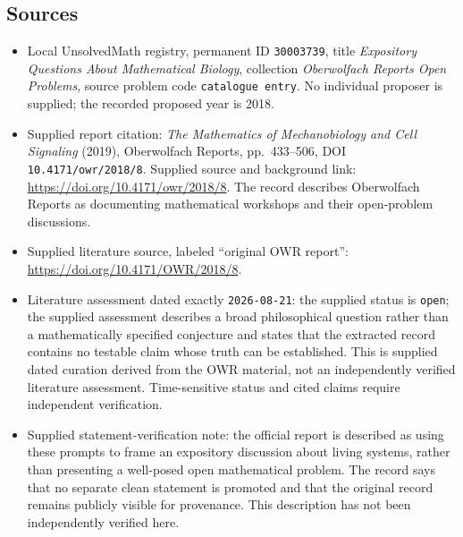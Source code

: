 \documentclass[11pt]{article}
\begin{document}
\subsection{Sources}
\begin{itemize}
\item Local UnsolvedMath registry, permanent ID \texttt{30003739}, title \emph{Expository Questions About Mathematical Biology}, collection \emph{Oberwolfach Reports Open Problems}, source problem code \texttt{catalogue entry}. No individual proposer is supplied; the recorded proposed year is 2018.
\item Supplied report citation: \emph{The Mathematics of Mechanobiology and Cell Signaling} (2019), Oberwolfach Reports, pp.\ 433--506, DOI \texttt{10.4171/owr/2018/8}. Supplied source and background link: \url{https://doi.org/10.4171/owr/2018/8}. The record describes Oberwolfach Reports as documenting mathematical workshops and their open-problem discussions.
\item Supplied literature source, labeled ``original OWR report'': \url{https://doi.org/10.4171/OWR/2018/8}.
\item Literature assessment dated exactly \texttt{2026-08-21}: the supplied status is \texttt{open}; the supplied assessment describes a broad philosophical question rather than a mathematically specified conjecture and states that the extracted record contains no testable claim whose truth can be established. This is supplied dated curation derived from the OWR material, not an independently verified literature assessment. Time-sensitive status and cited claims require independent verification.
\item Supplied statement-verification note: the official report is described as using these prompts to frame an expository discussion about living systems, rather than presenting a well-posed open mathematical problem. The record says that no separate clean statement is promoted and that the original record remains publicly visible for provenance. This description has not been independently verified here.
\end{itemize}
\end{document}
